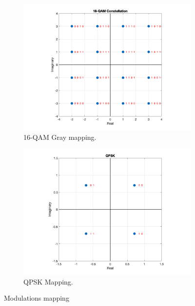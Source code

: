 \begin{figure}[h]

    \centering
    \begin{subfigure}{0.45\textwidth}
        \includegraphics*[scale = 0.21]{Images/16-QAM_Constellation.png}
        \caption{16-QAM Gray mapping.}
        \label{fig:QAM_Mapping}
    \end{subfigure}
    \begin{subfigure}{0.45\textwidth}
        \includegraphics*[scale = 0.21]{Images/QPKS_Mapping.png}
        \caption{QPSK Mapping.}
        \label{fig:QPSK_Mapping}
    \end{subfigure}
    
    \caption{Modulations mapping }
    \label{fig:mappings}
\end{figure}

